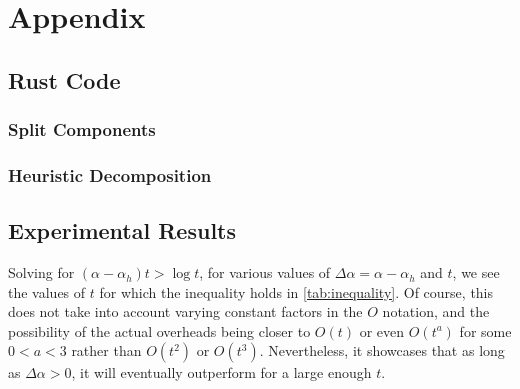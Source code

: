 \chapter{\label{app}Appendix}



\section{Rust Code}
\label{sec:rust-code}

\subsection{Split Components}



\clearpage
\subsection{Heuristic Decomposition}



\clearpage



\clearpage

\section{Experimental Results}
\label{sec:app-results}

Solving for $(\alpha - \alpha_h)t > \log t$, 
for various values of $\Delta \alpha = \alpha - \alpha_h$ and $t$,
we see the values of $t$ for which the inequality holds in \autoref{tab:inequality}.
Of course, this does not take into account varying constant factors in the $O$ notation,
and the possibility of the actual overheads being closer to $O(t)$ or even $O(t^a)$ for some $0<a<3$ 
rather than $O(t^2)$ or $O(t^3)$.
Nevertheless, it showcases that as long as $\Delta \alpha > 0$, 
it will eventually outperform for a large enough $t$.

